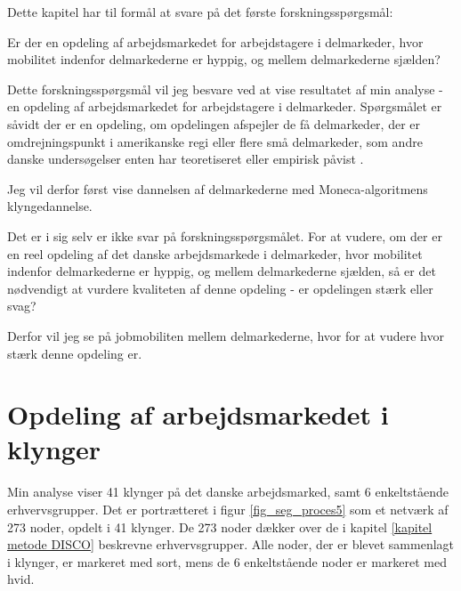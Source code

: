 Dette kapitel har til formål at svare på det første forskningsspørgsmål:

\begin{tcolorbox}[title=Forskningspørgsmål 1,
subtitle style={boxrule=0.4pt} ]
	Er der en opdeling af arbejdsmarkedet for arbejdstagere i delmarkeder, hvor mobilitet indenfor delmarkederne er hyppig, og mellem delmarkederne sjælden?
\end{tcolorbox}

Dette forskningsspørgsmål vil jeg besvare ved at vise resultatet af min analyse - en opdeling af arbejdsmarkedet for arbejdstagere i delmarkeder. Spørgsmålet er såvidt der er en opdeling, om opdelingen afspejler de få delmarkeder, der er omdrejningspunkt i amerikanske regi \parencite{Piore1980, Gordon1982} eller flere små delmarkeder, som andre danske undersøgelser enten har teoretiseret eller empirisk påvist \parencite{Boje1985, Touboel2013}.

Jeg vil derfor først vise dannelsen af delmarkederne med Moneca-algoritmens klyngedannelse.

Det er i sig selv er ikke svar på forskningsspørgsmålet. For at vudere, om der er en reel opdeling af det danske arbejdsmarkede i delmarkeder, hvor mobilitet indenfor delmarkederne er hyppig, og mellem delmarkederne sjælden, så er det nødvendigt at vurdere kvaliteten af denne opdeling - er opdelingen stærk eller svag?

Derfor vil jeg se på jobmobiliten mellem delmarkederne, hvor for at vudere hvor stærk denne opdeling er. 

\section{Opdeling af arbejdsmarkedet i klynger \label{delanalyse1_endelige mobilitetskort}}

Min analyse viser 41 klynger på det danske arbejdsmarked, samt 6 enkeltstående erhvervsgrupper. Det er portrætteret i figur \ref{fig_seg_proces5} som et netværk af 273 noder, opdelt i 41 klynger. De 273 noder dækker over de i kapitel \ref{kapitel metode DISCO} beskrevne erhvervsgrupper. Alle noder, der er blevet sammenlagt i klynger, er markeret med sort, mens de 6 enkeltstående noder er markeret med hvid. 




